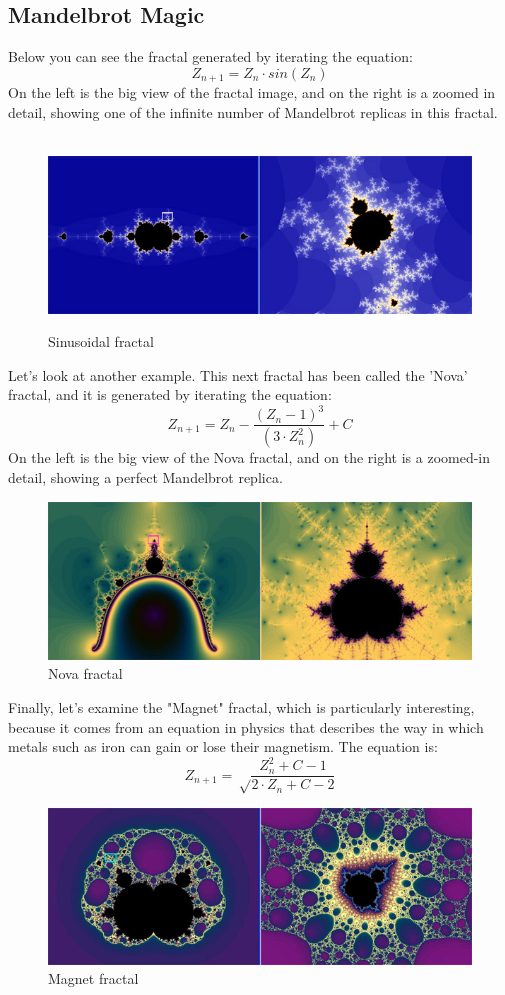 \documentclass{article}
\begin{document}
\begin{itemize}
\section{Mandelbrot Magic}
Below you can see the fractal generated by iterating the equation:
\Large $$Z_{n+1} = Z_{n} \cdot sin(Z_{n})$$ \normalsize
On the left is the big view of the fractal image, and on the right is a zoomed in detail, showing one of the infinite number of Mandelbrot replicas in this fractal.
\begin{figure}[H]
\centering
\hbox{\hspace{2em}
\includegraphics[scale=0.55]{sinusoidal.jpg}}
\caption{Sinusoidal fractal}
\end{figure}
Let's look at another example. This next fractal has been called the 'Nova' fractal, and it is generated by iterating the equation:
\Large $$Z_{n+1} = Z_{n} - \frac{(Z_{n}-1)^3}{(3 \cdot Z_{n}^2)} + C$$ \normalsize
On the left is the big view of the Nova fractal, and on the right is a zoomed-in detail, showing a perfect Mandelbrot replica.
\begin{figure}[H]
\centering
\includegraphics[scale=0.55]{nova.jpg}
\caption{Nova fractal}
\end{figure}
Finally, let's examine the "Magnet" fractal, which is particularly interesting, because it comes from an equation in physics that describes the way in which metals such as iron can gain or lose their magnetism. The equation is:
\Large $$Z_{n+1} = \sqrt \frac{Z_{n}^2 + C - 1}{2 \cdot Z_{n} + C -2}$$ \normalsize
\begin{figure}[H]
\centering
\includegraphics[scale=0.55]{magnet.jpg}
\caption{Magnet fractal}
\end{figure}


\end{itemize}
\end{document}
